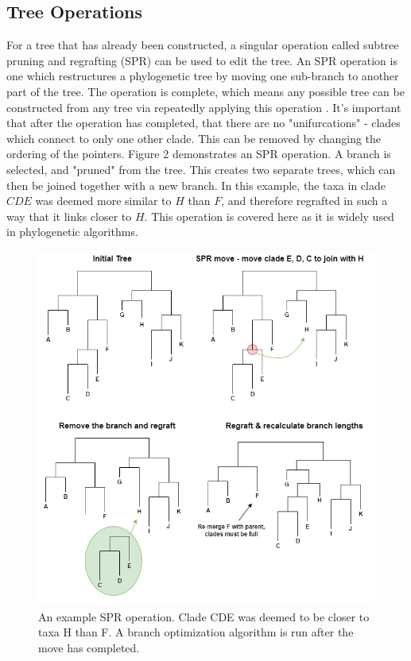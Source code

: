 \documentclass{mpaper}
\begin{document}
\subsection{Tree Operations}

For a tree that has already been constructed, a singular operation called subtree pruning and regrafting (SPR) can be used to edit the tree. An SPR operation is one which restructures a phylogenetic tree by moving one sub-branch to another part of the tree. The operation is complete, which means any possible tree can be constructed from any tree via repeatedly applying this operation \cite{semple2003phylogenetics}. It's important that after the operation has completed, that there are no "unifurcations" - clades which connect to only one other clade. This can be removed by changing the ordering of the pointers. Figure 2 demonstrates an SPR operation. A branch is selected, and "pruned" from the tree. This creates two separate trees, which can then be joined together with a new branch. In this example, the taxa in clade $CDE$ was deemed more similar to $H$ than $F$, and therefore regrafted in such a way that it links closer to $H$. This operation is covered here as it is widely used in phylogenetic algorithms.


\begin{figure}[h]
    \includegraphics[width=1\linewidth]{dissertation/images/spr_example.png}
    \centering
    \caption{An example SPR operation. Clade CDE was deemed to be closer to taxa H than F. A branch optimization algorithm is run after the move has completed.
    }
\end{figure}
\end{document}
